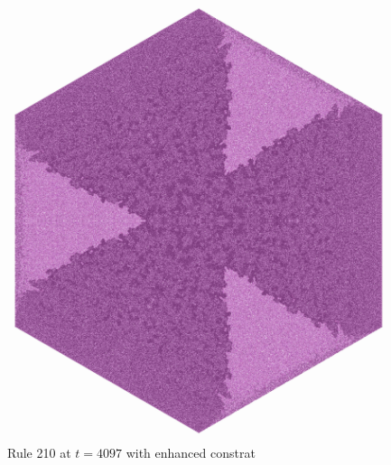 \documentclass{article}
\begin{document}
\begin{figure}[H]
    \centering
    \includegraphics[width=.85\textwidth]{graphics/behavior/rule-210/rule-210-time-4097-contrast.jpg}
    \caption{Rule 210 at $t=4097$ with enhanced constrat}
    \label{fig:rule-210-time-4097}
\end{figure}
\end{document}
